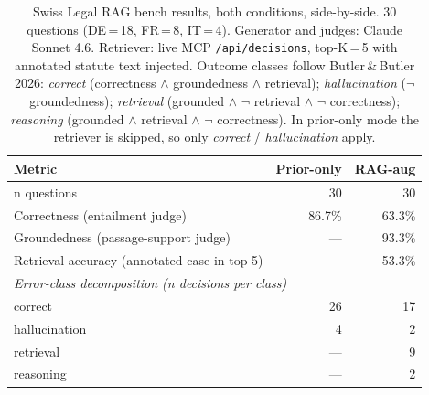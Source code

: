 \begin{table}[t]
\centering
\caption{Swiss Legal RAG bench results, both conditions, side-by-side. 30 questions (DE\,{=}\,18, FR\,{=}\,8, IT\,{=}\,4). Generator and judges: Claude Sonnet 4.6. Retriever: live MCP \texttt{/api/decisions}, top-K\,{=}\,5 with annotated statute text injected. Outcome classes follow Butler\,\&\,Butler 2026: \emph{correct} (correctness $\wedge$ groundedness $\wedge$ retrieval); \emph{hallucination} ($\neg$ groundedness); \emph{retrieval} (grounded $\wedge$ $\neg$ retrieval $\wedge$ $\neg$ correctness); \emph{reasoning} (grounded $\wedge$ retrieval $\wedge$ $\neg$ correctness). In prior-only mode the retriever is skipped, so only \emph{correct} / \emph{hallucination} apply.}
\label{tab:audit_bench_results}
\small
\begin{tabular}{l r r}
\toprule
\textbf{Metric} & \textbf{Prior-only} & \textbf{RAG-aug} \\
\midrule
n questions & 30 & 30 \\
Correctness (entailment judge) & 86.7\% & 63.3\% \\
Groundedness (passage-support judge) & --- & 93.3\% \\
Retrieval accuracy (annotated case in top-5) & --- & 53.3\% \\
\midrule
\multicolumn{3}{l}{\emph{Error-class decomposition (n decisions per class)}} \\
\quad correct          & 26 & 17 \\
\quad hallucination    & 4 & 2 \\
\quad retrieval        & ---           & 9 \\
\quad reasoning        & ---           & 2 \\
\bottomrule
\end{tabular}
\end{table}
